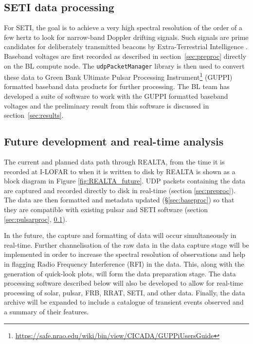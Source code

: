 

\subsection{SETI data processing}
\label{sect:pipeline_SETI}
For SETI, the goal is to achieve a very high spectral resolution of the order of a few hertz to look for narrow-band Doppler drifting signals. Such signals are prime candidates for deliberately transmitted beacons by Extra-Terrestrial Intelligence \citep[ETI;][]{Tarter2001}. Baseband voltages are first recorded as described in section~\ref{sec:preproc} directly on the BL compute node. The \texttt{udpPacketManager} library is then used to convert these data to Green Bank Ultimate Pulsar Processing Instrument\footnote{\hyperref[GUPPI]{https://safe.nrao.edu/wiki/bin/view/CICADA/GUPPiUsersGuide}} (GUPPI) formatted baseband data products for further processing. The BL team has developed a suite of software to work with the GUPPI formatted baseband voltages \citep{Lebofsky2019} and the preliminary result from this software is discussed in section~\ref{sec:results}. 

\subsection{Future development and real-time analysis}
\label{sec:future_software}
The current and planned data path through REALTA, from the time it is recorded at I-LOFAR to when it is written to disk by REALTA is shown as a block diagram in Figure \ref{fig:REALTA_future}. UDP packets containing the data are captured and recorded directly to disk in real-time (section \ref{sec:preproc}). The data are then formatted and metadata updated (\S \ref{sec:baseproc}) so that they are compatible with existing pulsar and SETI software (section \ref{sec:pulsarproc}, \ref{sect:pipeline_SETI}).

In the future, the capture and formatting of data will occur simultaneously in real-time. Further channelisation of the raw data in the data capture stage will be implemented in order to increase the spectral resolution of observations and help in flagging Radio Frequency Interference (RFI) in the data. This, along with the generation of quick-look plots, will form the data preparation stage. The data processing software described below will also be developed to allow for real-time processing of solar, pulsar, FRB, RRAT, SETI, and other data. Finally, the data archive will be expanded to include a catalogue of transient events observed and a summary of their features.

